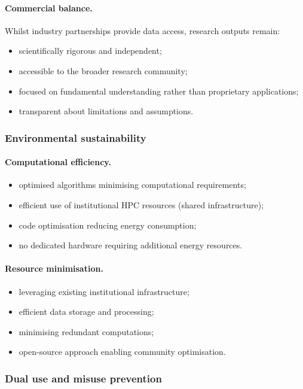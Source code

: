 \paragraph{Commercial balance.}
Whilst industry partnerships provide data access, research outputs remain:
\begin{itemize}
  \item scientifically rigorous and independent;
  \item accessible to the broader research community;
  \item focused on fundamental understanding rather than proprietary applications;
  \item transparent about limitations and assumptions.
\end{itemize}

\subsubsection{Environmental sustainability}

\paragraph{Computational efficiency.}
\begin{itemize}
  \item optimised algorithms minimising computational requirements;
  \item efficient use of institutional HPC resources (shared infrastructure);
  \item code optimisation reducing energy consumption;
  \item no dedicated hardware requiring additional energy resources.
\end{itemize}

\paragraph{Resource minimisation.}
\begin{itemize}
  \item leveraging existing institutional infrastructure;
  \item efficient data storage and processing;
  \item minimising redundant computations;
  \item open-source approach enabling community optimisation.
\end{itemize}

\subsubsection{Dual use and misuse prevention}

